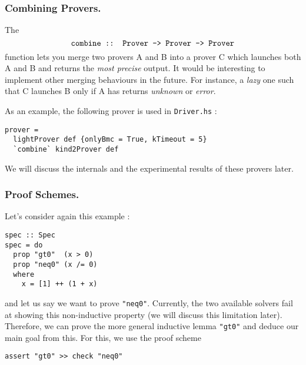 
\subsubsection{Combining Provers.}\label{combining-provers}

The
$$\texttt{combine :: Prover -\textgreater{} Prover -\textgreater{} Prover}$$
function lets you merge two provers A and B into a prover C which
launches both A and B and returns the \emph{most precise} output. It
would be interesting to implement other merging behaviours in the
future. For instance, a \emph{lazy} one such that C launches B only if A
has returns \emph{unknown} or \emph{error}.

As an example, the following prover is used in \texttt{Driver.hs} :

\begin{lstlisting}[frame=single]
prover =
  lightProver def {onlyBmc = True, kTimeout = 5} 
  `combine` kind2Prover def
\end{lstlisting}

We will discuss the internals and the experimental results of these
provers later.

\subsubsection{Proof Schemes.}\label{proof-schemes}

Let's consider again this example :

\begin{lstlisting}[frame=single]
spec :: Spec
spec = do
  prop "gt0"  (x > 0)
  prop "neq0" (x /= 0)
  where
    x = [1] ++ (1 + x)

\end{lstlisting}
and let us say we want to prove \texttt{"neq0"}. Currently, the two
available solvers fail at showing this non-inductive property (we will
discuss this limitation later). Therefore, we can prove the more general
inductive lemma \texttt{"gt0"} and deduce our main goal from this. For
this, we use the proof scheme

\begin{lstlisting}[frame=single]
assert "gt0" >> check "neq0"
\end{lstlisting}


